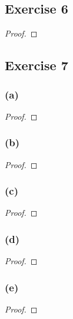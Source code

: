 \documentclass[14pt]{extarticle}
\begin{document}
\subsection{Exercise 6}

\begin{proof}

\end{proof}

\subsection{Exercise 7}

\subsubsection{(a)}

\begin{proof}

\end{proof}

\subsubsection{(b)}

\begin{proof}

\end{proof}

\subsubsection{(c)}

\begin{proof}

\end{proof}

\subsubsection{(d)}

\begin{proof}

\end{proof}

\subsubsection{(e)}

\begin{proof}

\end{proof}
\end{document}
